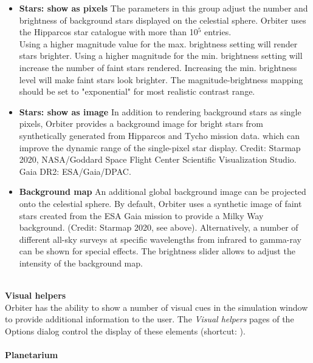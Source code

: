 \documentclass[Orbiter User Manual.tex]{subfiles}
\begin{document}
\noindent
{}

\begin{itemize}
\item \textbf{Stars: show as pixels} The parameters in this group adjust the number and brightness of background stars displayed on the celestial sphere. Orbiter uses the Hipparcos star catalogue with more than 10$^{5}$ entries.\\
Using a higher magnitude value for the max. brightness setting will render stars brighter. Using a higher magnitude for the min. brightness setting will increase the number of faint stars rendered. Increasing the min. brightness level will make faint stars look brighter. The magnitude-brightness mapping should be set to "exponential" for most realistic contrast range.
\item \textbf{Stars: show as image} In addition to rendering background stars as single pixels, Orbiter provides a background image for bright stars from synthetically generated from Hipparcos and Tycho mission data. which can improve the dynamic range of the single-pixel star display. Credit: Starmap 2020, NASA/Goddard Space Flight Center Scientific Visualization Studio. Gaia DR2: ESA/Gaia/DPAC.
\item \textbf{Background map} An additional global background image can be projected onto the celestial sphere. By default, Orbiter uses a synthetic image of faint stars created from the ESA Gaia mission to provide a Milky Way background. (Credit: Starmap 2020, see above). Alternatively, a number of different all-sky surveys at specific wavelengths from infrared to gamma-ray can be shown for special effects. The brightness slider allows to adjust the intensity of the background map.
\end{itemize}

\noindent
\\
\textbf{Visual helpers}\\
Orbiter has the ability to show a number of visual cues in the simulation window to provide additional information to the user. The \textit{Visual helpers} pages of the Options dialog control the display of these elements (shortcut: \Ctrl{}).\\
\\
\textbf{Planetarium}
\end{document}

